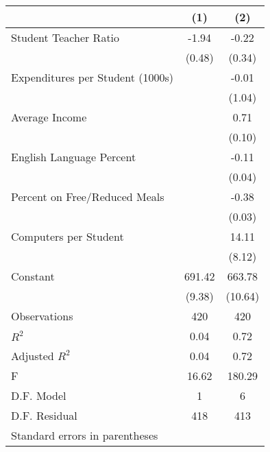 \begin{tabular}{l*{2}{c}}
\hline\hline
                    &\multicolumn{1}{c}{(1)}&\multicolumn{1}{c}{(2)}\\
\hline
Student Teacher Ratio&       -1.94&       -0.22\\
                    &      (0.48)&      (0.34)\\
[1em]
Expenditures per Student (1000s)&            &       -0.01\\
                    &            &      (1.04)\\
[1em]
Average Income      &            &        0.71\\
                    &            &      (0.10)\\
[1em]
English Language Percent&            &       -0.11\\
                    &            &      (0.04)\\
[1em]
Percent on Free/Reduced Meals&            &       -0.38\\
                    &            &      (0.03)\\
[1em]
Computers per Student&            &       14.11\\
                    &            &      (8.12)\\
[1em]
Constant            &      691.42&      663.78\\
                    &      (9.38)&     (10.64)\\
\hline
Observations        &         420&         420\\
\(R^{2}\)           &        0.04&        0.72\\
Adjusted \(R^{2}\)  &        0.04&        0.72\\
F                   &       16.62&      180.29\\
D.F. Model          &           1&           6\\
D.F. Residual       &         418&         413\\
\hline\hline
\multicolumn{3}{l}{\footnotesize Standard errors in parentheses}\\
\end{tabular}
